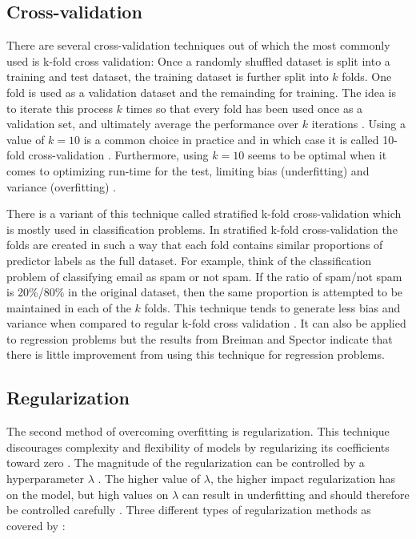 	\subsection{Cross-validation}
	There are several cross-validation techniques out of which the most commonly used is k-fold cross validation: Once a randomly shuffled dataset is split into a training and test dataset, the training dataset is further split into $k$ folds. One fold is used as a validation dataset and the remainding for training. The idea is to iterate this process $k$ times so that every fold has been used once as a validation set, and ultimately average the performance over $k$ iterations . Using a value of $k = 10$ is a common choice in practice and in which case it is called 10-fold cross-validation \cite{ARTICLE:4}. Furthermore, using $k=10$ seems to be optimal when it comes to optimizing run-time for the test, limiting bias (underfitting) and variance (overfitting) \cite{BOOK:4}.   

	There is a variant of this technique called stratified k-fold cross-validation which is mostly used in classification problems.  In stratified k-fold cross-validation the folds are created in such a way that each fold contains similar proportions of predictor labels as the full dataset. For example, think of the classification problem of classifying email as spam or not spam. If the ratio of spam/not spam is 20\%/80\% in the original dataset, then the same proportion is attempted to be maintained in each of the $k$ folds. This technique tends to generate less bias and variance when compared to regular k-fold cross validation \cite{IP:2}. It can also be applied to regression problems \cite{WEBSITE:10} but the results from Breiman and Spector \cite{ARTICLE:5} indicate that there is little improvement from using this technique for regression problems.

	\subsection{Regularization} \label{sec:regularization}
	The second method of overcoming overfitting is regularization. This technique discourages complexity and flexibility of models by regularizing its coefficients toward zero \cite{WEBSITE:13}. The magnitude of the regularization can be controlled by a hyperparameter $\lambda$ \cite{WEBSITE:12}. The higher value of $\lambda$, the higher impact regularization has on the model, but high values on $\lambda$ can result in underfitting and should therefore be controlled carefully \cite{WEBSITE:13}. Three different types of regularization methods as covered by \cite{WEBSITE:12}:

